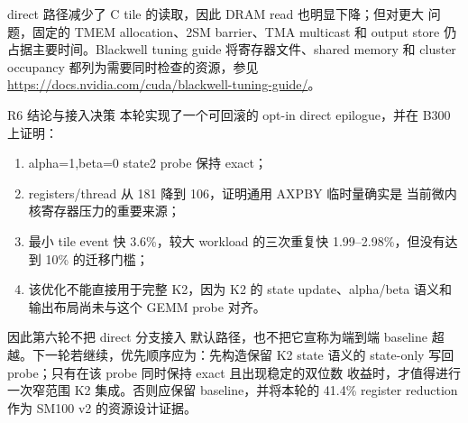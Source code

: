 direct 路径减少了 C tile 的读取，因此 DRAM read 也明显下降；但对更大
问题，固定的 TMEM allocation、2SM barrier、TMA multicast 和 output store
仍占据主要时间。Blackwell tuning guide 将寄存器文件、shared memory 和
cluster occupancy 都列为需要同时检查的资源，参见
\url{https://docs.nvidia.com/cuda/blackwell-tuning-guide/}。

\begin{record}{R6 结论与接入决策}
本轮实现了一个可回滚的 opt-in direct epilogue，并在 B300 上证明：
\begin{enumerate}
\item alpha=1,beta=0 state2 probe 保持 exact；
\item registers/thread 从 181 降到 106，证明通用 AXPBY 临时量确实是
      当前微内核寄存器压力的重要来源；
\item 最小 tile event 快 3.6\%，较大 workload 的三次重复快
      1.99--2.98\%，但没有达到 10\% 的迁移门槛；
\item 该优化不能直接用于完整 K2，因为 K2 的 state update、alpha/beta
      语义和输出布局尚未与这个 GEMM probe 对齐。
\end{enumerate}

因此第六轮不把 direct 分支接入 \FlashKDA 默认路径，也不把它宣称为端到端
baseline 超越。下一轮若继续，优先顺序应为：先构造保留 K2 state 语义的
state-only 写回 probe；只有在该 probe 同时保持 exact 且出现稳定的双位数
收益时，才值得进行一次窄范围 K2 集成。否则应保留 baseline，并将本轮的
41.4\% register reduction 作为 SM100 v2 的资源设计证据。
\end{record}
